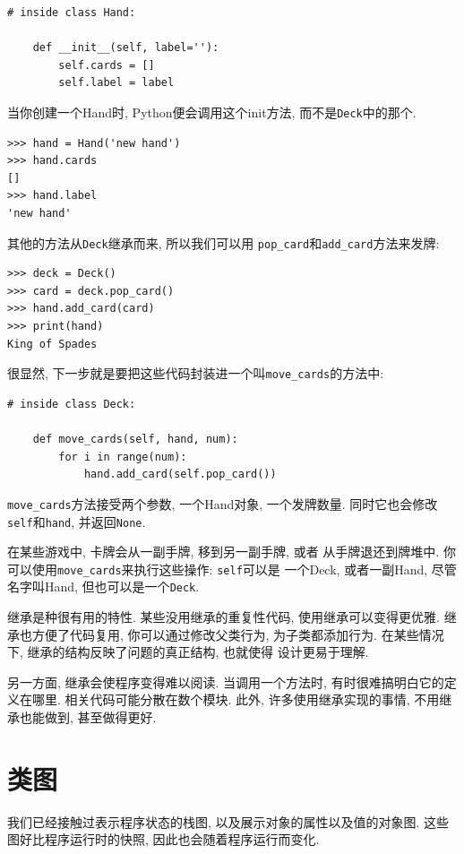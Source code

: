 \documentclass[10pt]{book}
\begin{document}
\begin{verbatim}
# inside class Hand:

    def __init__(self, label=''):
        self.cards = []
        self.label = label
\end{verbatim}
%
当你创建一个Hand时, Python便会调用这个init方法, 而不是{\tt Deck}中的那个. 

\begin{verbatim}
>>> hand = Hand('new hand')
>>> hand.cards
[]
>>> hand.label
'new hand'
\end{verbatim}
%
其他的方法从{\tt Deck}继承而来, 所以我们可以用
\verb"pop_card"和\verb"add_card"方法来发牌:

\begin{verbatim}
>>> deck = Deck()
>>> card = deck.pop_card()
>>> hand.add_card(card)
>>> print(hand)
King of Spades
\end{verbatim}
%
很显然, 下一步就是要把这些代码封装进一个叫\verb"move_cards"的方法中:

\begin{verbatim}
# inside class Deck:

    def move_cards(self, hand, num):
        for i in range(num):
            hand.add_card(self.pop_card())
\end{verbatim}
%

\verb"move_cards"方法接受两个参数, 一个Hand对象, 一个发牌数量. 
同时它也会修改{\tt self}和{\tt hand}, 并返回{\tt None}.

在某些游戏中, 卡牌会从一副手牌, 移到另一副手牌, 或者
从手牌退还到牌堆中. 
你可以使用\verb"move_cards"来执行这些操作: {\tt self}可以是
一个Deck, 或者一副Hand, 尽管名字叫Hand, 但也可以是一个{\tt Deck}.

继承是种很有用的特性. 
某些没用继承的重复性代码, 使用继承可以变得更优雅. 
继承也方便了代码复用, 你可以通过修改父类行为, 
为子类都添加行为. 
在某些情况下, 继承的结构反映了问题的真正结构, 也就使得
设计更易于理解. 

另一方面, 继承会使程序变得难以阅读. 
当调用一个方法时, 有时很难搞明白它的定义在哪里. 
相关代码可能分散在数个模块. 
此外, 许多使用继承实现的事情, 不用继承也能做到, 甚至做得更好. 


\section{类图}
\label{class.diagram}

我们已经接触过表示程序状态的栈图, 以及展示对象的属性以及值的对象图. 
这些图好比程序运行时的快照, 因此也会随着程序运行而变化. 
\end{document}
